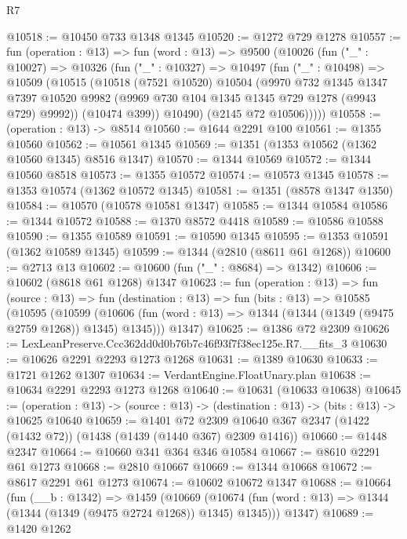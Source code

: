 \begin{lexlean}{R7}
\begin{coremodule}
@10518 := @10450 @733 @1348 @1345
@10520 := @1272 @729 @1278
@10557 := fun (operation : @13) =>
  fun (word : @13) =>
  @9500
    (@10026
      (fun ("_" : @10027) =>
      @10326
        (fun ("_" : @10327) =>
        @10497
          (fun ("_" : @10498) =>
          @10509
            (@10515
              (@10518
                (@7521 @10520)
                @10504
                (@9970
                  @732
                  @1345
                  @1347
                  @7397
                  @10520
                  @9982
                  (@9969 @730 @104 @1345 @1345 @729 @1278 (@9943 @729) @9992))
                (@10474 @399))
              @10490)
            (@2145 @72 @10506)))))
@10558 := (operation : @13) -> @8514
@10560 := @1644 @2291 @100
@10561 := @1355 @10560
@10562 := @10561 @1345
@10569 := @1351 (@1353 @10562 (@1362 @10560 @1345) @8516 @1347)
@10570 := @1344 @10569
@10572 := @1344 @10560 @8518
@10573 := @1355 @10572
@10574 := @10573 @1345
@10578 := @1353 @10574 (@1362 @10572 @1345)
@10581 := @1351 (@8578 @1347 @1350)
@10584 := @10570 (@10578 @10581 @1347)
@10585 := @1344 @10584
@10586 := @1344 @10572
@10588 := @1370 @8572 @4418
@10589 := @10586 @10588
@10590 := @1355 @10589
@10591 := @10590 @1345
@10595 := @1353 @10591 (@1362 @10589 @1345)
@10599 := @1344 (@2810 (@8611 @61 @1268))
@10600 := @2713 @13
@10602 := @10600 (fun ("_" : @8684) => @1342)
@10606 := @10602 (@8618 @61 @1268) @1347
@10623 := fun (operation : @13) =>
  fun (source : @13) =>
  fun (destination : @13) =>
  fun (bits : @13) =>
  @10585
    (@10595
      (@10599 (@10606 (fun (word : @13) => @1344 (@1344 (@1349 (@9475 @2759 @1268)) @1345) @1345)))
      @1347)
@10625 := @1386 @72 @2309
@10626 := LexLeanPreserve.Ccc362dd0d0b76b7c46f93f7f38ec125e.R7.__fits_3
@10630 := @10626 @2291 @2293 @1273 @1268
@10631 := @1389 @10630
@10633 := @1721 @1262 @1307
@10634 := VerdantEngine.FloatUnary.plan
@10638 := @10634 @2291 @2293 @1273 @1268
@10640 := @10631 (@10633 @10638)
@10645 := (operation : @13) ->
  (source : @13) -> (destination : @13) -> (bits : @13) -> @10625 @10640
@10659 := @1401
    @72
    @2309
    @10640
    @367
    @2347
    (@1422 (@1432 @72))
    (@1438 (@1439 (@1440 @367) @2309 @1416))
@10660 := @1448 @2347
@10664 := @10660 @341 @364 @346 @10584
@10667 := @8610 @2291 @61 @1273
@10668 := @2810 @10667
@10669 := @1344 @10668
@10672 := @8617 @2291 @61 @1273
@10674 := @10602 @10672 @1347
@10688 := @10664
    (fun (__b : @1342) =>
    @1459
      (@10669 (@10674 (fun (word : @13) => @1344 (@1344 (@1349 (@9475 @2724 @1268)) @1345) @1345)))
      @1347)
@10689 := @1420 @1262

\end{coremodule}
\end{lexlean}
